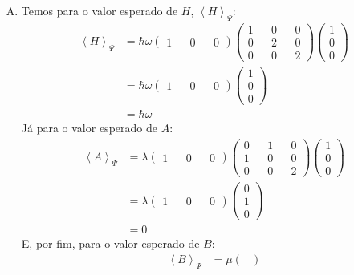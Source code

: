 \documentclass[a4paper, 12pt, notitlepage]{article}
\begin{document}
\begin{enumerate}
\begin{enumerate}[(A)]
  \item Temos para o valor esperado de $H$, $\left\langle H \right\rangle_\Psi$:
  \begin{align*}
  \left\langle H \right\rangle_\Psi &= \hbar \omega \begin{pmatrix}
  1 && 0 && 0 \end{pmatrix} \begin{pmatrix}
  1 && 0 && 0 \\
  0 && 2 && 0 \\
  0 && 0 && 2
  \end{pmatrix} \begin{pmatrix} 1 \\ 0 \\ 0 \end{pmatrix} \\
  &= \hbar \omega\begin{pmatrix} 1 && 0 && 0 \end{pmatrix} \begin{pmatrix}
  1 \\ 0 \\ 0 \end{pmatrix} \\
  &= \hbar \omega
  \end{align*}
  Já para o valor esperado de $A$:
  \begin{align*}
  \left\langle A \right\rangle_\Psi &= \lambda \begin{pmatrix}
  1 && 0 && 0 \end{pmatrix} \begin{pmatrix}
  0 && 1 && 0 \\
  1 && 0 && 0 \\
  0 && 0 && 2
  \end{pmatrix} \begin{pmatrix} 1 \\ 0 \\ 0 \end{pmatrix} \\
  &= \lambda\begin{pmatrix} 1 && 0 && 0 \end{pmatrix} \begin{pmatrix}
  0 \\ 1 \\ 0 \end{pmatrix} \\
  &= 0
  \end{align*}
  E, por fim, para o valor esperado de $B$:
  \begin{align*}
  \left\langle B \right\rangle_\Psi &= \mu \begin{pmatrix}

\end{pmatrix}
\end{align*}
\end{enumerate}
\end{enumerate}
\end{document}
